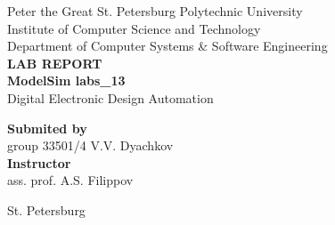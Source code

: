\begin{titlepage}
\begin{center}
	Peter the Great St. Petersburg Polytechnic University\\[0.3cm]
	Institute of Computer Science and Technology\\[0.3cm]
	Department of Computer Systems \& Software Engineering\\[4.5cm]
	
	\textbf{LAB REPORT}\\[0.5cm]
	\textbf{ModelSim labs\_13}\\[0.1cm]
	Digital Electronic Design Automation\\[4.5cm]
\end{center}

\begin{flushright}
	\begin{minipage}{0.4\textwidth}
		\textbf{Submited by}\\[3mm]
		group 33501/4 \hspace*{3mm} V.V. Dyachkov\\[5mm]
		\textbf{Instructor}\\[5mm]
		\sign[1.8cm] \hspace*{0mm} ass. prof. A.S. Filippov\\[5mm]
	\end{minipage}
\end{flushright}

\vfill

\begin{center}
	St. Petersburg\\
	\the\year
\end{center}
\end{titlepage}

\addtocounter{page}{1}
